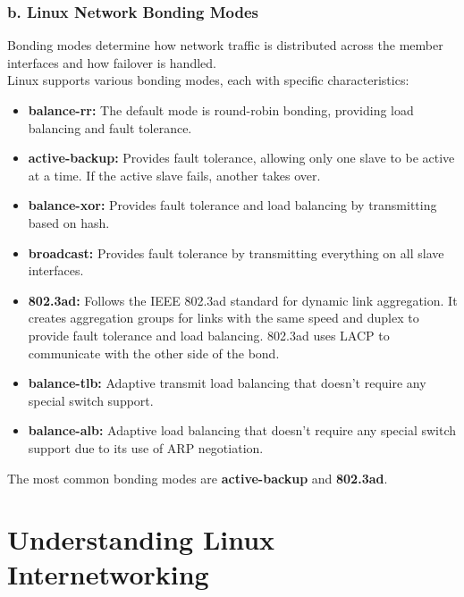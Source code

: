 \documentclass{report}
\begin{document}
\subsection*{b. Linux Network Bonding Modes}
Bonding modes determine how network traffic is distributed across the member interfaces and how failover is handled.\\
Linux supports various bonding modes, each with specific characteristics:

\begin{itemize}
  \item \textbf{balance-rr:} The default mode is round-robin bonding, providing load balancing and fault tolerance.
  
  \item \textbf{active-backup:} Provides fault tolerance, allowing only one slave to be active at a time. If the active slave fails, another takes over.

  \item \textbf{balance-xor:} Provides fault tolerance and load balancing by transmitting based on hash.

  \item \textbf{broadcast:} Provides fault tolerance by transmitting everything on all slave interfaces.

  \item \textbf{802.3ad:} Follows the IEEE 802.3ad standard for dynamic link aggregation. It creates aggregation groups for links with the same speed and duplex to provide fault tolerance and load balancing. 802.3ad uses LACP to communicate with the other side of the bond.

  \item \textbf{balance-tlb:} Adaptive transmit load balancing that doesn't require any special switch support.

  \item \textbf{balance-alb:} Adaptive load balancing that doesn't require any special switch support due to its use of ARP negotiation.\cite{5}
\end{itemize}

The most common bonding modes are \textbf{active-backup} and \textbf{802.3ad}.


\chapter*{Understanding Linux Internetworking}
\end{document}
